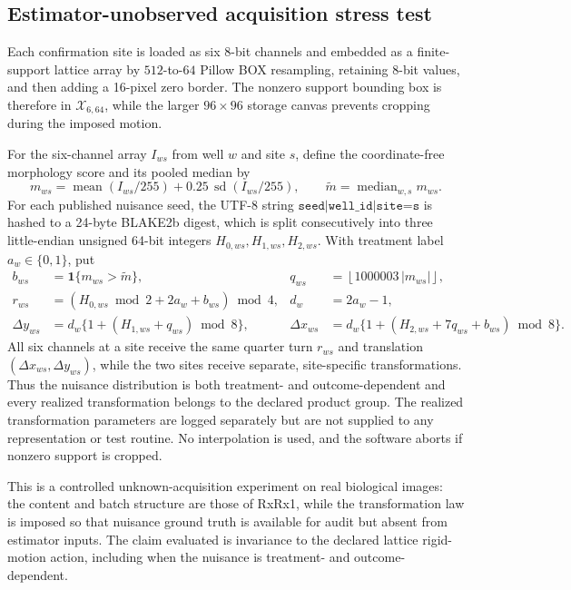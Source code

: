 \documentclass[11pt]{article}
\theoremstyle{definition}
\theoremstyle{remark}
\newcommand{\cX}{\mathcal X}
\newcommand{\1}{\mathbf 1}
\begin{document}
\subsection{Estimator-unobserved acquisition stress test}

Each confirmation site is loaded as six 8-bit channels and embedded as a
finite-support lattice array by \(512\)-to-\(64\) Pillow BOX resampling,
retaining 8-bit values, and then adding a 16-pixel zero border.  The nonzero
support bounding box is therefore in \(\cX_{6,64}\), while the larger
\(96\times96\) storage canvas prevents cropping during the imposed motion.

For the six-channel array \(I_{ws}\) from well \(w\) and site \(s\), define the
coordinate-free morphology score and its pooled median by
\[
 m_{ws}=\operatorname{mean}(I_{ws}/255)
       +0.25\,\operatorname{sd}(I_{ws}/255),
 \qquad
 \widetilde m=\operatorname{median}_{w,s}m_{ws}.
\]
For each published nuisance seed, the UTF-8 string
\(\texttt{seed|well\_id|site=s}\) is hashed to a 24-byte BLAKE2b digest, which
is split consecutively into three little-endian unsigned 64-bit integers
\(H_{0,ws},H_{1,ws},H_{2,ws}\).  With treatment label \(a_w\in\{0,1\}\), put
\[
\begin{aligned}
 b_{ws}&=\1\{m_{ws}>\widetilde m\},&
 q_{ws}&=\left\lfloor 1000003\,|m_{ws}|\right\rfloor,\\
 r_{ws}&=(H_{0,ws}\bmod 2+2a_w+b_{ws})\bmod4,&
 d_w&=2a_w-1,\\
 \Delta y_{ws}
 &=d_w\{1+(H_{1,ws}+q_{ws})\bmod8\},&
 \Delta x_{ws}
 &=d_w\{1+(H_{2,ws}+7q_{ws}+b_{ws})\bmod8\}.
\end{aligned}
\]
All six channels at a site receive the same quarter turn \(r_{ws}\) and
translation \((\Delta x_{ws},\Delta y_{ws})\), while the two sites receive
separate, site-specific transformations.  Thus the nuisance distribution is both
treatment- and outcome-dependent and every realized transformation belongs to
the declared product group.  The realized transformation parameters are
logged separately but are not supplied to any representation or test
routine.  No interpolation is used, and the software aborts if nonzero support
is cropped.

This is a controlled unknown-acquisition experiment on real biological images:
the content and batch structure are those of RxRx1, while the transformation
law is imposed so that nuisance ground truth is available for audit but absent
from estimator inputs.  The claim evaluated is invariance to the declared
lattice rigid-motion action, including when the nuisance is treatment- and
outcome-dependent.
\end{document}
